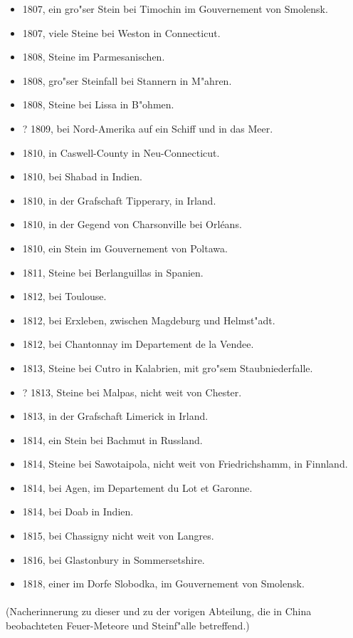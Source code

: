 \documentclass[a4paper, 11pt, oneside, polutonikogreek, german]{article}
\begin{document}
\begin{itemize}
    \item 1807, ein gro"ser Stein bei Timochin im Gouvernement von Smolensk.
    \item 1807, viele Steine bei Weston in Connecticut.
    \item 1808, Steine im Parmesanischen.
    \item 1808, gro"ser Steinfall bei Stannern in M"ahren.
    \item 1808, Steine bei Lissa in B"ohmen.
    \item ? 1809, bei Nord-Amerika auf ein Schiff und in das Meer.
    \item 1810, in Caswell-County in Neu-Connecticut.
    \item 1810, bei Shabad in Indien.
    \item 1810, in der Grafschaft Tipperary, in Irland.
    \item 1810, in der Gegend von Charsonville bei Orléans.
    \item 1810, ein Stein im Gouvernement von Poltawa.
    \item 1811, Steine bei Berlanguillas in Spanien.
    \item 1812, bei Toulouse.
    \item 1812, bei Erxleben, zwischen Magdeburg und Helmst"adt.
    \item 1812, bei Chantonnay im Departement de la Vendee.
    \item 1813, Steine bei Cutro in Kalabrien, mit gro"sem Staubniederfalle.
    \item ? 1813, Steine bei Malpas, nicht weit von Chester.
    \item 1813, in der Grafschaft Limerick in Irland.
    \item 1814, ein Stein bei Bachmut in Russland.
    \item 1814, Steine bei Sawotaipola, nicht weit von Friedrichshamm, in Finnland.
    \item 1814, bei Agen, im Departement du Lot et Garonne.
    \item 1814, bei Doab in Indien.
    \item 1815, bei Chassigny nicht weit von Langres.
    \item 1816, bei Glastonbury in Sommersetshire.
    \item 1818, einer im Dorfe Slobodka, im Gouvernement von Smolensk.
\end{itemize}
\paragraph{}
 (Nacherinnerung zu dieser und zu der vorigen Abteilung, die in China beobachteten Feuer-Meteore und Steinf"alle betreffend.)
\end{document}
